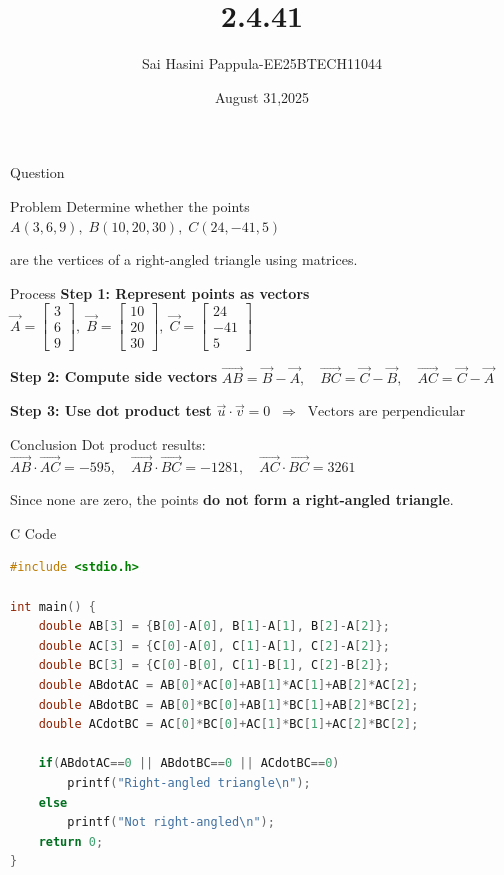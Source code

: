 \documentclass{beamer}
\title %
{2.4.41}
\date{August 31,2025}
\author %
{Sai Hasini Pappula-EE25BTECH11044}
\begin{document}
\begin{frame}
  \titlepage
\end{frame}

\begin{frame}{Question}
\begin{block}{Problem}
Determine whether the points 
$A(3,6,9), \; B(10,20,30), \; C(24,-41,5)$

are the vertices of a right-angled triangle using matrices.
\end{block}
\end{frame}

\begin{frame}{Process}
\textbf{Step 1: Represent points as vectors}
$\vec{A}=\begin{bmatrix}3\\6\\9\end{bmatrix}, \;
\vec{B}=\begin{bmatrix}10\\20\\30\end{bmatrix}, \;
\vec{C}=\begin{bmatrix}24\\-41\\5\end{bmatrix}$

\textbf{Step 2: Compute side vectors}
$\vec{AB}=\vec{B}-\vec{A}, \quad
\vec{BC}=\vec{C}-\vec{B}, \quad
\vec{AC}=\vec{C}-\vec{A}$


\textbf{Step 3: Use dot product test}
$\vec{u}\cdot \vec{v} = 0 \;\;\Rightarrow\;\; \text{Vectors are perpendicular}$

\end{frame}

\begin{frame}{Conclusion}
Dot product results:
$\vec{AB}\cdot \vec{AC} = -595,\quad
\vec{AB}\cdot \vec{BC} = -1281,\quad
\vec{AC}\cdot \vec{BC} = 3261$


Since none are zero, the points \textbf{do not form a right-angled triangle}.
\end{frame}

\begin{frame}[fragile]{C Code}
\begin{lstlisting}[language=C]
#include <stdio.h>

int main() {
    double AB[3] = {B[0]-A[0], B[1]-A[1], B[2]-A[2]};
    double AC[3] = {C[0]-A[0], C[1]-A[1], C[2]-A[2]};
    double BC[3] = {C[0]-B[0], C[1]-B[1], C[2]-B[2]};
    double ABdotAC = AB[0]*AC[0]+AB[1]*AC[1]+AB[2]*AC[2];
    double ABdotBC = AB[0]*BC[0]+AB[1]*BC[1]+AB[2]*BC[2];
    double ACdotBC = AC[0]*BC[0]+AC[1]*BC[1]+AC[2]*BC[2];

    if(ABdotAC==0 || ABdotBC==0 || ACdotBC==0)
        printf("Right-angled triangle\n");
    else
        printf("Not right-angled\n");
    return 0;
}
\end{lstlisting}
\end{frame}
\end{document}
